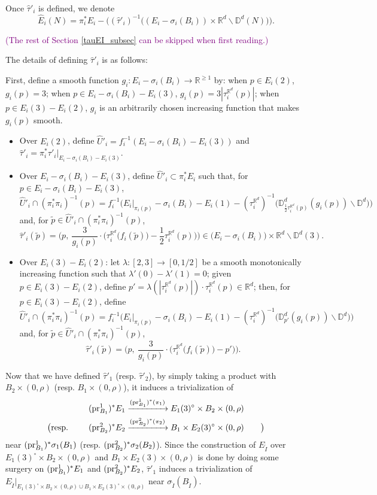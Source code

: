 \documentclass[11pt]{article}
\theoremstyle{definition}
\theoremstyle{remark}
\def\R{\mathbb{R}}
\def\D{\mathbb{D}}
\def\rI{{\mathring{I}}}
\def\cmt#1{\textcolor{purple}{(#1)}}
\def\tn#1{\textnormal{#1}}
\def\pr{{\textnormal{pr}}}
\begin{document}
Once $\hat\tau'_i$ is defined, we denote 
$$\hat{E}_i(N)=\pi_i^*E_i-\Big((\hat\tau'_i)^{-1}\big((E_i-\sigma_i(B_i))\times\R^d\backslash\D^d(N)\big)\Big).$$


\cmt{The rest of Section \ref{tauEI_subsec} can be skipped when first reading.}

The details of defining $\hat\tau'_i$ is as follows:

First, define a smooth function
$g_i:E_i-\sigma_i(B_i)\to \R^{\ge1}$ by: 
when $p\in E_i(2)$, 
$g_i(p)=
3$; when $p\in E_i-\sigma_i(B_i)-E_i(3)$, 
$g_i(p)= 3|\tau^{\R^d}_i(p)|$; 
when $p\in E_i(3)-E_i(2)$, $g_i$ is an arbitrarily chosen increasing function that makes $g_i(p)$ smooth. 

\begin{itemize}
\item Over $E_i(2)$, define $\hat{U}'_i=f_i^{-1}(E_i-\sigma_i(B_i)-E_i(3))$ and $\hat\tau'_i=\pi_i^*\tau'_i|_{E_i-\sigma_i(B_i)-E_i(3)}$. 
\item Over $E_i-\sigma_i(B_i)-E_i(3)$, define $\hat{U}'_i\subset \pi^*_iE_i$ such that, for $p\in E_i-\sigma_i(B_i)-E_i(3)$, 
$$\hat{U}'_i\cap (\pi_i^*\pi_i)^{-1}(p)=f_i^{-1}\Big(E_i|_{\pi_i(p)}-\sigma_i(B_i)-E_i(1)-(\tau^{\R^d}_i)^{-1}\big(\D^d_{\frac{1}{2}\tau^{\R^d}_i(p)}(g_i(p))\backslash\D^d\big)\Big)$$
and, for $\tilde{p}\in \hat{U}'_i\cap(\pi_i^*\pi_i)^{-1}(p)$, 
$$\hat\tau'_i(\tilde{p})=\Big(p,\ 
\frac{3}{g_i(p)}\cdot\big(\tau^{\R^d}_i\big(f_i(\tilde p)\big)-\frac{1}{2}\tau^{\R^d}_i(p)\big)\Big)\in  \big(E_i-\sigma_i(B_i)\big)\times \R^d\backslash\D^d(3).$$
\item Over $E_i(3)-E_i(2)$: let $\lambda:[2,3]\to[0,1/2]$ be a smooth monotonically increasing function such that $\lambda'(0)-\lambda'(1)=0$; given $p\in E_i(3)-E_i(2)$, define $p'=\lambda(|\tau^{\R^d}_i(p)|)\cdot\tau^{\R^d}_i(p)\in\R^d$; 
then, for $p\in E_i(3)-E_i(2)$, define
$$\hat{U}'_i\cap (\pi_i^*\pi_i)^{-1}(p)=f_i^{-1}\Big(E_i|_{\pi_i(p)}-\sigma_i(B_i)-E_i(1)-(\tau^{\R^d}_i)^{-1}\big(\D^d_{p'}(g_i(p))\backslash\D^d\big)\Big)$$
and, for $\tilde{p}\in \hat{U}'_i\cap(\pi_i^*\pi_i)^{-1}(p)$, 
$$\hat\tau'_i(\tilde{p})=\Big(p,\ \frac{3}{g_i(p)}\cdot\big(\tau^{\R^d}_i\big(f_i(\tilde p)\big)-p'\big)\Big).$$
\end{itemize}

Now that we have defined $\hat\tau'_1$ (resp. $\hat\tau'_2$), by simply taking a product with $B_2\times(0,\rho)$ (resp. $B_1\times(0,\rho)$), it induces a trivialization of 
\begin{align*}
(\pr^1_{B_1})^*E_1&\xrightarrow{(\pr^1_{B_1})^*(\pi_1)}E_1(3)^\circ\times B_2\times(0,\rho)\\
\big(\tn{resp. }\qquad (\pr^2_{B_2})^*E_2&\xrightarrow{(\pr^2_{B_2})^*(\pi_2)}B_1\times E_2(3)^\circ\times(0,\rho)\qquad\big)
\end{align*}
near $(\pr^1_{B_1})^*\sigma_1(B_1)$ (resp. $(\pr^2_{B_2})^*\sigma_2(B_2)$).
Since the construction of $E_\rI$ over $E_1(3)^\circ\times B_2\times(0,\rho)$ and $B_1\times E_2(3)\times(0,\rho)$ is done by doing some surgery on $(\pr^1_{B_1})^*E_1$ and $(\pr^2_{B_2})^*E_2$, $\hat\tau'_1$ induces a trivialization of $E_\rI|_{E_1(3)^\circ\times B_2\times(0,\rho)\cup B_1\times E_2(3)^\circ\times(0,\rho)}$ near $\sigma_\rI(B_\rI)$. 
\end{document}
